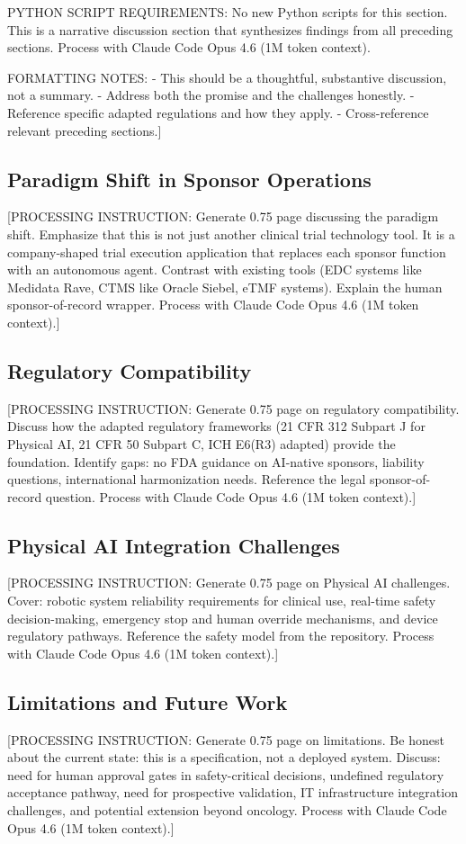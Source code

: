 PYTHON SCRIPT REQUIREMENTS: No new Python scripts for this section.
This is a narrative discussion section that synthesizes findings from
all preceding sections. Process with Claude Code Opus 4.6 (1M token context).

FORMATTING NOTES:
- This should be a thoughtful, substantive discussion, not a summary.
- Address both the promise and the challenges honestly.
- Reference specific adapted regulations and how they apply.
- Cross-reference relevant preceding sections.]

\subsection{Paradigm Shift in Sponsor Operations}

[PROCESSING INSTRUCTION: Generate 0.75 page discussing the paradigm shift. Emphasize
that this is not just another clinical trial technology tool. It is a company-shaped
trial execution application that replaces each sponsor function with an autonomous agent.
Contrast with existing tools (EDC systems like Medidata Rave, CTMS like Oracle Siebel,
eTMF systems). Explain the human sponsor-of-record wrapper.
Process with Claude Code Opus 4.6 (1M token context).]

\subsection{Regulatory Compatibility}

[PROCESSING INSTRUCTION: Generate 0.75 page on regulatory compatibility. Discuss how the
adapted regulatory frameworks (21 CFR 312 Subpart J for Physical AI, 21 CFR 50 Subpart C,
ICH E6(R3) adapted) provide the foundation. Identify gaps: no FDA guidance on AI-native
sponsors, liability questions, international harmonization needs. Reference the legal
sponsor-of-record question. Process with Claude Code Opus 4.6 (1M token context).]

\subsection{Physical AI Integration Challenges}

[PROCESSING INSTRUCTION: Generate 0.75 page on Physical AI challenges. Cover: robotic
system reliability requirements for clinical use, real-time safety decision-making,
emergency stop and human override mechanisms, and device regulatory pathways.
Reference the safety model from the repository.
Process with Claude Code Opus 4.6 (1M token context).]

\subsection{Limitations and Future Work}

[PROCESSING INSTRUCTION: Generate 0.75 page on limitations. Be honest about the current
state: this is a specification, not a deployed system. Discuss: need for human approval
gates in safety-critical decisions, undefined regulatory acceptance pathway, need for
prospective validation, IT infrastructure integration challenges, and potential extension
beyond oncology. Process with Claude Code Opus 4.6 (1M token context).]
